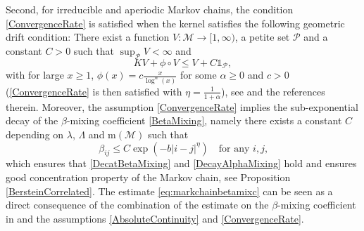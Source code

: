 \documentclass[11pt,a4paper,oneside]{amsart}
\numberwithin{equation}{section}
\newtheorem{theorem}{Theorem}[section]
\newcommand{\dd}{\mathrm{d}}
\newcommand{\pp}{\mathrm{P}}
\newcommand{\m}{\mathrm{m}}
\begin{document}
%
\medskip
%

Second, for irreducible and aperiodic Markov chains, the condition \eqref{ConvergenceRate} is satisfied when the kernel satisfies the following geometric drift condition: There exist a function $V: \mathcal{M}\rightarrow [1,\infty)$, a petite set $\mathcal{P}$ and a constant $C>0$ such that $\sup_{\mathcal{P}} V<\infty$ and
%
$$KV+\phi\circ V\leq V+C\mathds{1}_\mathcal{P},$$
%
with for large $x\geq 1$, $\phi(x)=c\frac{x}{\log^\alpha(x)}$ for some $\alpha\geq 0$ and $c>0$ (\eqref{ConvergenceRate} is then satisfied with $\eta=\frac{1}{1+\alpha}$), see \cite[Theorem 2.8 \& Section 2.3]{douc2004practical} and the references therein. Moreover, the assumption \eqref{ConvergenceRate} implies the sub-exponential decay of the $\beta$-mixing coefficient \eqref{BetaMixing}, namely there exists a constant $C$ depending on $\lambda$, $\Lambda$ and $\m(\mathcal{M})$ such that
%
\begin{equation}\label{eq:markchainbetamixc}
\beta_{ij}\leq C\exp(-b\vert i-j\vert^\eta)\quad\text{for any $i,j$,}
\end{equation}
% 
which ensures that \eqref{DecatBetaMixing} and \eqref{DecayAlphaMixing} hold and ensures good concentration property of the Markov chain, see Proposition \ref{BersteinCorrelated}. The estimate \eqref{eq:markchainbetamixc} can be seen as a direct consequence of the combination of the estimate on the $\beta$-mixing coefficient in \cite[Proposition 3]{liebscher2005towards} and the assumptions \eqref{AbsoluteContinuity} and \eqref{ConvergenceRate}.
%
%
\end{document}

